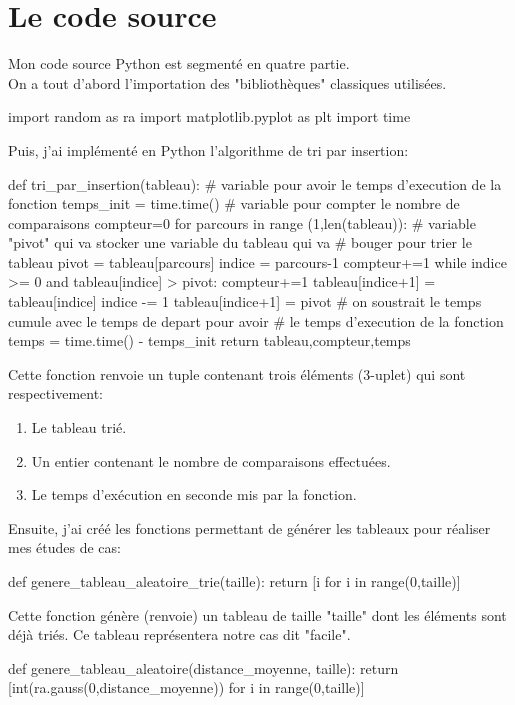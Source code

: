 \documentclass[a4paper,12pt]{article}
\begin{document}
\section{Le code source}
Mon code source Python est segmenté en quatre partie. \\
On a tout d'abord l'importation des "bibliothèques" classiques utilisées. 
\begin{python}
  import random as ra
  import matplotlib.pyplot as plt
  import time
\end{python} 
Puis, j'ai implémenté en Python l'algorithme de tri par insertion:
\begin{python}
  def tri_par_insertion(tableau):
      # variable pour avoir le temps d'execution de la fonction
      temps_init = time.time()
      # variable pour compter le nombre de comparaisons
      compteur=0
      for parcours in range (1,len(tableau)):
          # variable "pivot" qui va stocker une variable du tableau qui va 
          # bouger pour trier le tableau
          pivot = tableau[parcours]
          indice = parcours-1
          compteur+=1
          while indice >= 0 and tableau[indice] > pivot:
              compteur+=1
              tableau[indice+1] = tableau[indice]
              indice -= 1
          tableau[indice+1] = pivot
      # on soustrait le temps cumule avec le temps de depart pour avoir 
      # le temps d'execution de la fonction
      temps = time.time() - temps_init
      return tableau,compteur,temps
\end{python}
Cette fonction renvoie un tuple contenant trois éléments (3-uplet) qui sont respectivement:
\begin{enumerate}
  \item Le tableau trié.
  \item Un entier contenant le nombre de comparaisons effectuées.
  \item Le temps d'exécution en seconde mis par la fonction.
\end{enumerate}
Ensuite, j'ai créé les fonctions permettant de générer les tableaux pour réaliser mes études de cas: 
\begin{python}
  def genere_tableau_aleatoire_trie(taille):
    return [i for i in range(0,taille)]
\end{python}
Cette fonction génère (renvoie) un tableau de taille "taille" dont les éléments sont déjà triés. Ce tableau représentera notre cas dit "facile".
\begin{python}
  def genere_tableau_aleatoire(distance_moyenne, taille):
    return [int(ra.gauss(0,distance_moyenne)) for i in range(0,taille)]
\end{python}
\end{document}
